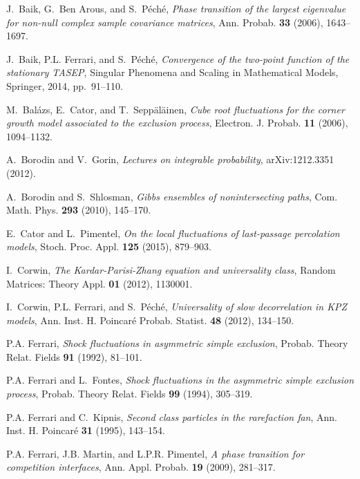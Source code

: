 \documentclass[12pt,a4paper]{article}
\numberwithin{equation}{section}
\begin{document}
\begin{thebibliography}{10}

J.~Baik, G.~{Ben Arous}, and S.~P\'ech\'e, \emph{Phase transition of the
  largest eigenvalue for non-null complex sample covariance matrices}, Ann.
  Probab. \textbf{33} (2006), 1643--1697.

J.~Baik, P.L. Ferrari, and S.~P{\'e}ch{\'e}, \emph{{Convergence of the
  two-point function of the stationary TASEP}}, {Singular Phenomena and Scaling
  in Mathematical Models}, Springer, 2014, pp.~91--110.

M.~Bal{\'a}zs, E.~Cator, and T.~Sepp{\"a}l{\"a}inen, \emph{Cube root
  fluctuations for the corner growth model associated to the exclusion
  process}, Electron. J. Probab. \textbf{11} (2006), 1094--1132.

A.~Borodin and V.~Gorin, \emph{Lectures on integrable probability},
  arXiv:1212.3351 (2012).

A.~Borodin and S.~Shlosman, \emph{Gibbs ensembles of nonintersecting paths},
  Com. Math. Phys. \textbf{293} (2010), 145--170.

E.~Cator and L.~Pimentel, \emph{On the local fluctuations of last-passage
  percolation models}, Stoch. Proc. Appl. \textbf{125} (2015), 879--903.

I.~Corwin, \emph{{The Kardar-Parisi-Zhang equation and universality class}},
  Random Matrices: Theory Appl. \textbf{01} (2012), 1130001.

I.~Corwin, P.L. Ferrari, and S.~P{\'e}ch{\'e}, \emph{{Universality of slow
  decorrelation in KPZ models}}, Ann. Inst. H. Poincar\'e Probab. Statist.
  \textbf{48} (2012), 134--150.

P.A. Ferrari, \emph{Shock fluctuations in asymmetric simple exclusion}, Probab.
  Theory Relat. Fields \textbf{91} (1992), 81--101.

P.A. Ferrari and L.~Fontes, \emph{{Shock fluctuations in the asymmetric simple
  exclusion process}}, Probab. Theory Relat. Fields \textbf{99} (1994),
  305--319.

P.A. Ferrari and C.~Kipnis, \emph{Second class particles in the rarefaction
  fan}, Ann. Inst. H. Poincar\'e \textbf{31} (1995), 143--154.

P.A. Ferrari, J.B. Martin, and L.P.R. Pimentel, \emph{A phase transition for
  competition interfaces}, Ann. Appl. Probab. \textbf{19} (2009), 281--317.


\end{thebibliography}
\end{document}
